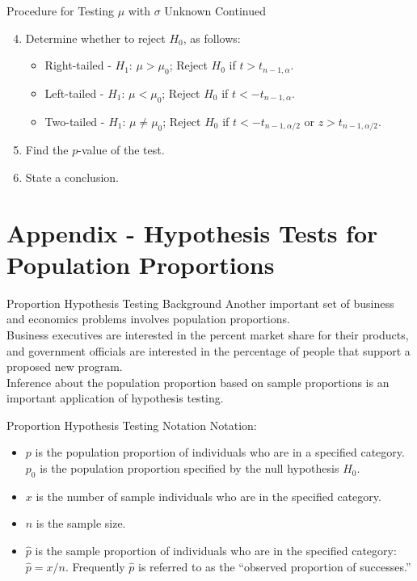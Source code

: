 \documentclass[pdf]{beamer}
\theoremstyle{remark}
\theoremstyle{definition}
\begin{document}
\begin{frame}[t]{Procedure for Testing $\mu$ with $\sigma$ Unknown Continued}
\begin{enumerate}
  \setcounter{enumi}{3}
\item Determine whether to reject $H_0$, as follows:
 \begin{itemize}
  \item Right-tailed - $H_1\text{: }  \mu > \mu_0$; Reject $H_0$ if $t > t_{n-1,\alpha}$.
  \item Left-tailed - $H_1\text{: }  \mu < \mu_0$; Reject $H_0$ if $t < -t_{n-1,\alpha}$.
  \item Two-tailed - $H_1\text{: }  \mu \ne \mu_0$; Reject $H_0$ if $t < -t_{n-1,\alpha/2}$ or $z > t_{n-1,\alpha/2}$.
\end{itemize}
\item Find the $p$-value of the test. 
\item State a conclusion.
\end{enumerate}
\end{frame}

\section{Appendix - Hypothesis Tests for Population Proportions}

\begin{frame}[t]{Proportion Hypothesis Testing Background}
Another important set of business and economics problems involves population proportions. \\
\vspace{1.5ex}
Business executives are interested in the percent market share for their products, and government officials are interested in the percentage of people that support a proposed new program. \\
\vspace{1.5ex} 
Inference about the population proportion based on sample proportions is an important application of hypothesis testing. 
\end{frame}

\begin{frame}[t]{Proportion Hypothesis Testing Notation}
Notation: \\
\vspace{1.5ex}
\begin{itemize}
\item $p$ is the population proportion of individuals who are in a specified category. $p_0$ is the population proportion specified by the null hypothesis $H_0$.
\item $x$ is the number of sample individuals who are in the specified category.
\item $n$ is the sample size.
\item $\hat{p}$ is the sample proportion of individuals who are in the specified category:  $\hat{p} = x/n$. Frequently $\hat{p}$ is referred to as the  ``observed proportion of successes.''
\end{itemize}
\end{frame}
\end{document}
